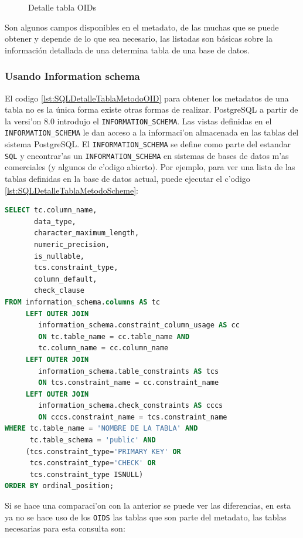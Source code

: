 \begin{figure}[H]
\centering
{}
\caption{Detalle tabla OIDs} \label{fig:Detalle Metodo OID}
\end{figure}
Son algunos campos disponibles en el metadato, de las muchas que se puede obtener y depende de lo que sea necesario, las listadas son b\'asicas sobre la informaci\'on detallada de una determina tabla de una base de datos.
\subsubsection{Usando Information schema}
El codigo \ref{lst:SQLDetalleTablaMetodoOID} para obtener los metadatos de una tabla no es la \'unica forma existe otras formas de realizar.
PostgreSQL  a partir de la versi'on 8.0 introdujo el \texttt{INFORMATION\_SCHEMA}. Las vistas definidas en el \texttt{INFORMATION\_SCHEMA} le dan acceso a la informaci'on almacenada en las tablas del sistema PostgreSQL. El \texttt{INFORMATION\_SCHEMA} se define como parte del estandar \texttt{SQL} y encontrar'as un \texttt{INFORMATION\_SCHEMA} en sistemas de bases de datos m'as comerciales (y algunos de c'odigo abierto). Por ejemplo, para ver una lista de las tablas definidas en la base de datos actual, puede ejecutar el c'odigo \ref{lst:SQLDetalleTablaMetodoScheme}:

\begin{lstlisting}[caption={Query para detalle obtener el detalle de una tabla information scheme},label={lst:SQLDetalleTablaMetodoScheme},language=sql]
SELECT tc.column_name,
       data_type,
       character_maximum_length,
       numeric_precision,
       is_nullable,
       tcs.constraint_type,
       column_default,
       check_clause
FROM information_schema.columns AS tc
     LEFT OUTER JOIN
        information_schema.constraint_column_usage AS cc
     	ON tc.table_name = cc.table_name AND
        tc.column_name = cc.column_name
     LEFT OUTER JOIN
        information_schema.table_constraints AS tcs
     	ON tcs.constraint_name = cc.constraint_name
     LEFT OUTER JOIN
        information_schema.check_constraints AS cccs
     	ON cccs.constraint_name = tcs.constraint_name
WHERE tc.table_name = 'NOMBRE DE LA TABLA' AND
      tc.table_schema = 'public' AND
     (tcs.constraint_type='PRIMARY KEY' OR 
      tcs.constraint_type='CHECK' OR 
      tcs.constraint_type ISNULL)
ORDER BY ordinal_position;
\end{lstlisting}
Si se hace una comparaci'on con la anterior se puede ver las diferencias, en esta ya no se hace uso de los \texttt{OIDS} las tablas que son parte del metadato, las tablas necesarias para esta consulta son:

